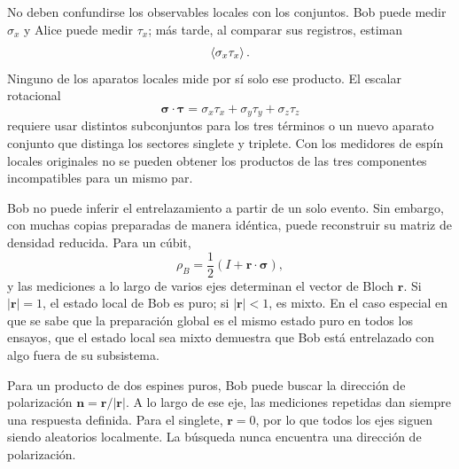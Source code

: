No deben confundirse los observables locales con los conjuntos. Bob puede medir \(\sigma_x\) y Alice puede medir \(\tau_x\); más tarde, al comparar sus registros, estiman
\begin{equation}
\left\langle\sigma_x\tau_x\right\rangle.
\end{equation}
Ninguno de los aparatos locales mide por sí solo ese producto. El escalar rotacional
\begin{equation}
\boldsymbol{\sigma}\cdot\boldsymbol{\tau}
=\sigma_x\tau_x+\sigma_y\tau_y+\sigma_z\tau_z
\end{equation}
requiere usar distintos subconjuntos para los tres términos o un nuevo aparato conjunto que distinga los sectores singlete y triplete. Con los medidores de espín locales originales no se pueden obtener los productos de las tres componentes incompatibles para un mismo par.

\begin{classroomqa}
\end{classroomqa}

Bob no puede inferir el entrelazamiento a partir de un solo evento. Sin embargo, con muchas copias preparadas de manera idéntica, puede reconstruir su matriz de densidad reducida. Para un cúbit,
\begin{equation}
\rho_B
=\frac12\left(
I+\mathbf r\cdot\boldsymbol{\sigma}
\right),
\label{eq:l7-bloch-density}
\end{equation}
y las mediciones a lo largo de varios ejes determinan el vector de Bloch \(\mathbf r\). Si \(|\mathbf r|=1\), el estado local de Bob es puro; si \(|\mathbf r|<1\), es mixto. En el caso especial en que se sabe que la preparación global es el mismo estado puro en todos los ensayos, que el estado local sea mixto demuestra que Bob está entrelazado con algo fuera de su subsistema.

Para un producto de dos espines puros, Bob puede buscar la dirección de polarización \(\mathbf n=\mathbf r/|\mathbf r|\). A lo largo de ese eje, las mediciones repetidas dan siempre una respuesta definida. Para el singlete, \(\mathbf r=0\), por lo que todos los ejes siguen siendo aleatorios localmente. La búsqueda nunca encuentra una dirección de polarización.

